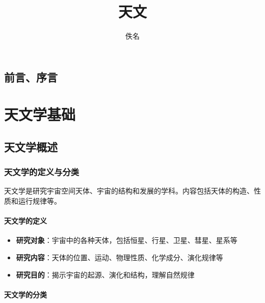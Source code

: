 \documentclass[12pt,UTF8]{ctexbook}
\title{\heiti\zihao{0} 天文}
\author{佚名}
\date{}
\begin{document}
\maketitle
\tableofcontents

\frontmatter
\chapter{前言、序言}

\mainmatter

\part{天文学基础}

\chapter{天文学概述}
\section{天文学的定义与分类}

天文学是研究宇宙空间天体、宇宙的结构和发展的学科。内容包括天体的构造、性质和运行规律等。

\subsection{天文学的定义}

\begin{itemize}
  \item \textbf{研究对象}：宇宙中的各种天体，包括恒星、行星、卫星、彗星、星系等
  \item \textbf{研究内容}：天体的位置、运动、物理性质、化学成分、演化规律等
  \item \textbf{研究目的}：揭示宇宙的起源、演化和结构，理解自然规律
\end{itemize}

\subsection{天文学的分类}
\end{document}
